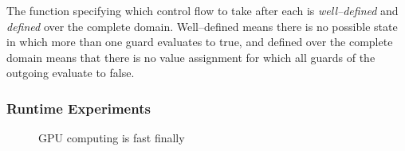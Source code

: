 The function specifying which control flow to take after each  is \emph{well--defined} and \emph{defined} over the complete domain. Well--defined means there is no possible state in which more than one guard evaluates to true, and defined over the complete domain means that there is no value assignment for which all guards of the outgoing  evaluate to false.
\subsubsection{Runtime Experiments}
\begin{figure}
% 
% 
% 
% 
% 
%
\caption{GPU computing is fast finally}
\label{fig:MaxPlot}
\end{figure}

